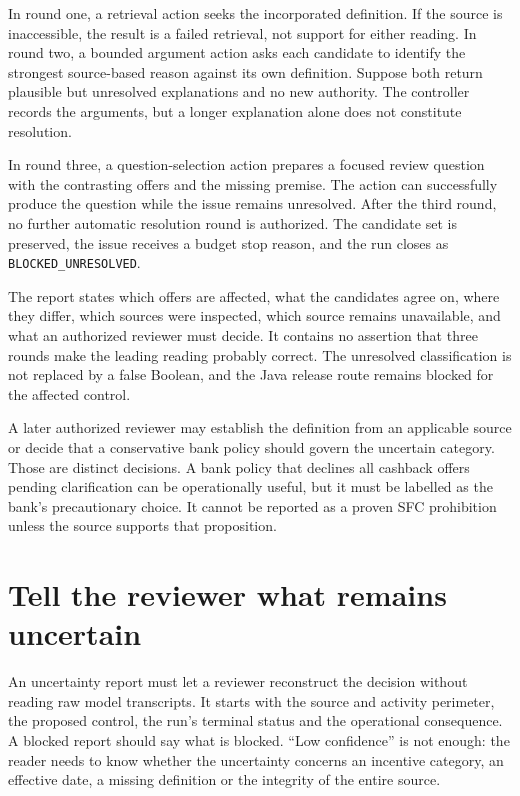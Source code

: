 In round one, a retrieval action seeks the incorporated definition. If the source
is inaccessible, the result is a failed retrieval, not support for either
reading. In round two, a bounded argument action asks each candidate to identify
the strongest source-based reason against its own definition. Suppose both
return plausible but unresolved explanations and no new authority. The controller
records the arguments, but a longer explanation alone does not constitute
resolution.


In round three, a question-selection action prepares a focused review question
with the contrasting offers and the missing premise. The action can successfully
produce the question while the issue remains unresolved. After the third round,
no further automatic resolution round is authorized. The candidate set is
preserved, the issue receives a budget stop reason, and the run closes as
\texttt{BLOCKED\_UNRESOLVED}.

The report states which offers are affected, what the candidates agree on, where
they differ, which sources were inspected, which source remains unavailable, and
what an authorized reviewer must decide. It contains no assertion that three
rounds make the leading reading probably correct. The unresolved classification
is not replaced by a false Boolean, and the Java release route remains blocked
for the affected control.

A later authorized reviewer may establish the definition from an applicable
source or decide that a conservative bank policy should govern the uncertain
category. Those are distinct decisions. A bank policy that declines all cashback
offers pending clarification can be operationally useful, but it must be labelled
as the bank's precautionary choice. It cannot be reported as a proven SFC
prohibition unless the source supports that proposition.

\section{Tell the reviewer what remains uncertain}
\label{merge:M06:22}


An uncertainty report must let a reviewer reconstruct the decision without
reading raw model transcripts. It starts with the source and activity perimeter,
the proposed control, the run's terminal status and the operational consequence.
A blocked report should say what is blocked. ``Low confidence'' is not enough:
the reader needs to know whether the uncertainty concerns an incentive category,
an effective date, a missing definition or the integrity of the entire source.

